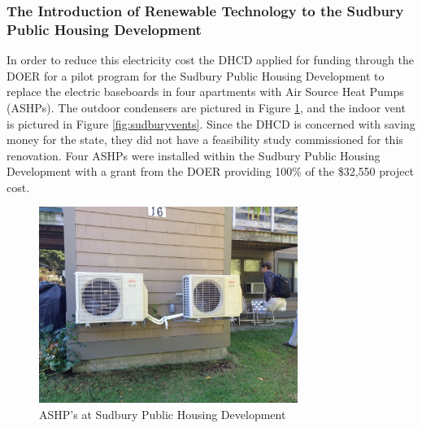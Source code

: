 \subsubsection{The Introduction of Renewable Technology to the Sudbury Public Housing Development}
\par In order to reduce this electricity cost the DHCD applied for funding through the DOER for a pilot program for the Sudbury Public Housing Development to replace the electric baseboards in four apartments with Air Source Heat Pumps (ASHPs). The outdoor condensers are pictured in Figure \ref{fig:sudburyashps}, and the indoor vent is pictured in Figure \ref{fig:sudburyvents}. Since the DHCD is concerned with saving money for the state, they did not have a feasibility study commissioned for this renovation. Four ASHPs were installed within the Sudbury Public Housing Development with a grant from the DOER providing 100\% of the \$32,550 project cost.
\begin{figure}[H]
\centering
\includegraphics[width=0.75\textwidth]{findingschapter/sudburyoutsideunits}
\caption{ASHP's at Sudbury Public Housing Development}
\label{fig:sudburyashps}
\end{figure}


